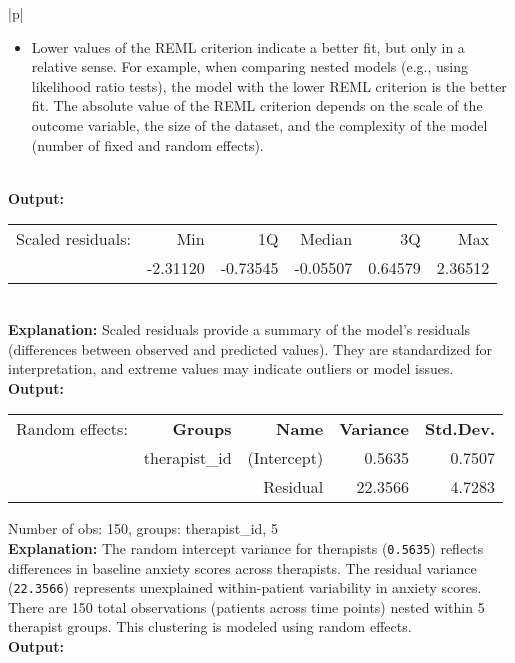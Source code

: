 {\begin{longtable}{|p{\linewidth}|}
\begin{itemize}
\item Lower values of the REML criterion indicate a better fit, but only in a relative sense. For example, when comparing nested models (e.g., using likelihood ratio tests), the model with the lower REML criterion is the better fit. The absolute value of the REML criterion depends on the scale of the outcome variable, the size of the dataset, and the complexity of the model (number of fixed and random effects).\end{itemize}\\
\hline
{}
\textbf{Output:} \newline  
\begin{tabular}{rrrrrr}
Scaled residuals: & Min & 1Q & Median & 3Q & Max \\
& -2.31120 & -0.73545 & -0.05507 & 0.64579 & 2.36512 \\
\end{tabular} \\
\hline
\textbf{Explanation:} \newline 
Scaled residuals provide a summary of the model's residuals (differences between observed and predicted values). They are standardized for interpretation, and extreme values may indicate outliers or model issues. \\
\hline
{}
\textbf{Output:} \newline 
\begin{tabular}{lrrrr}
Random effects: & \textbf{Groups} & \textbf{Name} & \textbf{Variance} & \textbf{Std.Dev.} \\
& therapist\_id & (Intercept) & 0.5635 & 0.7507 \\
& & Residual & 22.3566 & 4.7283 \\
\end{tabular}\newline
Number of obs: 150, groups: therapist\_id, 5 \\ 
\hline
\textbf{Explanation:} \newline 
The random intercept variance for therapists (\texttt{0.5635}) reflects differences in baseline anxiety scores across therapists. The residual variance (\texttt{22.3566}) represents unexplained within-patient variability in anxiety scores. \newline
There are 150 total observations (patients across time points) nested within 5 therapist groups. This clustering is modeled using random effects.\\
\hline
{}
\textbf{Output:} \newline 

\end{longtable}}
